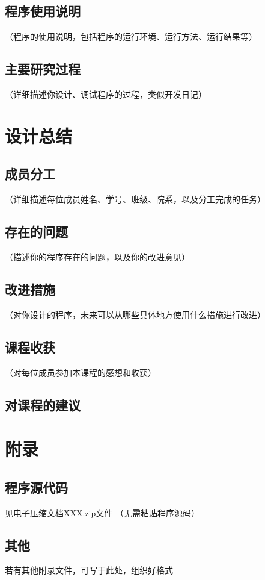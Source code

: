 \documentclass[UTF8,AutoFakeBold,AutoFakeSlant,zihao=-4]{ctexart}
\begin{document}
\subsection{程序使用说明}
（程序的使用说明，包括程序的运行环境、运行方法、运行结果等）

\subsection{主要研究过程}
（详细描述你设计、调试程序的过程，类似开发日记）

\section{设计总结}

\subsection{成员分工}
（详细描述每位成员姓名、学号、班级、院系，以及分工完成的任务）

\subsection{存在的问题}
（描述你的程序存在的问题，以及你的改进意见）

\subsection{改进措施}
（对你设计的程序，未来可以从哪些具体地方使用什么措施进行改进）

\subsection{课程收获}
（对每位成员参加本课程的感想和收获）

\subsection{对课程的建议}

\section{附录}
\subsection{程序源代码}
见电子压缩文档XXX.zip文件
（无需粘贴程序源码）

\subsection{其他}
若有其他附录文件，可写于此处，组织好格式
\end{document}
